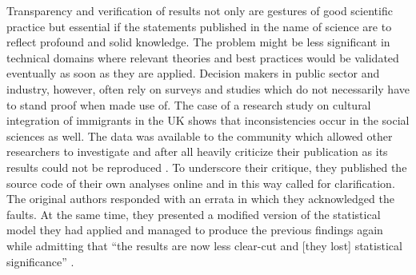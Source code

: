 \documentclass{acm_proc_article-sp}
\begin{document}
Transparency and verification of results not only are gestures of good scientific practice but essential if the statements published in the name of science are to reflect profound and solid knowledge.
The problem might be less significant in technical domains where relevant theories and best practices would be validated eventually as soon as they are applied.
Decision makers in public sector and industry, however, often rely on surveys and studies which do not necessarily have to stand proof when made use of. 
The case of a research study on cultural integration of immigrants in the UK  
shows that inconsistencies occur in the social sciences as well.
The data was available to the community \cite{dataset_FNSEM} which allowed other researchers to investigate and after all heavily criticize their publication as its results could not be reproduced \cite{arai2011fragile}.
To underscore their critique, they published the source code of their own analyses online and in this way called for clarification. %
The original authors responded with an errata in which they acknowledged the faults.
At the same time, they presented a modified version of the statistical model they had applied and managed to produce the previous findings again while admitting that ``the results are now less clear-cut and [they lost] statistical significance'' \cite{bisin2011errata}.
%
%
 
\end{document}
